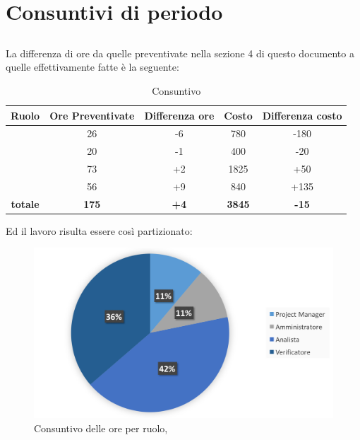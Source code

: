 \section{Consuntivi di periodo}

\subsection{\ARM}

La differenza di ore da quelle preventivate nella sezione 4 di questo documento a quelle effettivamente fatte è la seguente:

\begin{table}[h]
	\begin{center}
		\begin{tabular}{|c|c|c|c|c|}
			\hline
			\textbf{Ruolo}	& \textbf{Ore Preventivate} & \textbf{Differenza ore} & \textbf{Costo} & \textbf{Differenza costo}\\
			\hline
			\Pm &	26  &	-6 &	780 &	-180\\
			\hline
			\Am	&	20 &	-1 & 400 & -20\\
			\hline
			\An		&	73 &	+2 & 1825 & +50\\
			\hline
			\Ver	&	56 &	+9 & 840 & +135\\
			\hline
			\textbf{totale}	&	\textbf{175} &	\textbf{+4} & \textbf{3845} & \textbf{-15}\\
			\hline
		\end{tabular}
	\end{center}
	\caption{Consuntivo \ARM}
\end{table}

Ed il lavoro risulta essere così partizionato:

\begin{figure}[H]
	\centering 
	\includegraphics[scale=0.7]{Immagini/Consuntivo/GraficoConsuntivo.png}
	\caption{Consuntivo delle ore per ruolo, \ARM}
\end{figure}

